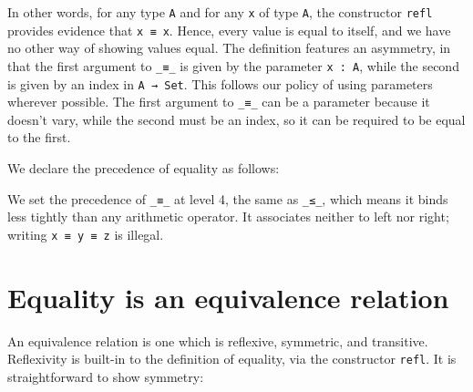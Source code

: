 In other words, for any type \texttt{A} and for any \texttt{x} of type
\texttt{A}, the constructor \texttt{refl} provides evidence that
\texttt{x\ ≡\ x}. Hence, every value is equal to itself, and we have no
other way of showing values equal. The definition features an asymmetry,
in that the first argument to \texttt{\_≡\_} is given by the parameter
\texttt{x\ :\ A}, while the second is given by an index in
\texttt{A\ →\ Set}. This follows our policy of using parameters wherever
possible. The first argument to \texttt{\_≡\_} can be a parameter
because it doesn't vary, while the second must be an index, so it can be
required to be equal to the first.

We declare the precedence of equality as follows:

\begin{fence}
\begin{code}%
\>[0]\AgdaSpace{}%
\AgdaSpace{}%
\<%
\end{code}
\end{fence}

We set the precedence of \texttt{\_≡\_} at level 4, the same as
\texttt{\_≤\_}, which means it binds less tightly than any arithmetic
operator. It associates neither to left nor right; writing
\texttt{x\ ≡\ y\ ≡\ z} is illegal.

\hypertarget{equality-is-an-equivalence-relation}{%
\section{Equality is an equivalence
relation}\label{equality-is-an-equivalence-relation}}

An equivalence relation is one which is reflexive, symmetric, and
transitive. Reflexivity is built-in to the definition of equality, via
the constructor \texttt{refl}. It is straightforward to show symmetry:

\begin{fence}
\begin{code}%
\>[0]\AgdaSpace{}%
\AgdaSymbol{:}\AgdaSpace{}%
\AgdaSpace{}%
\AgdaSymbol{\{}\AgdaSpace{}%
\AgdaSymbol{:}\AgdaSpace{}%
\AgdaSymbol{\}}\AgdaSpace{}%
\AgdaSymbol{\{}\AgdaSpace{}%
\AgdaSpace{}%
\AgdaSymbol{:}\AgdaSpace{}%
\AgdaSymbol{\}}\<%
\\
\>[0][@{}l@{\AgdaIndent{0}}]%
\>[2]%
\>[29I]\AgdaSpace{}%
\AgdaSpace{}%
\<%
\\
\>[.][@{}l@{}]\<[29I]%
\>[4]\AgdaComment{-----}\<%
\\
%
\>[2]\AgdaSpace{}%
\AgdaSpace{}%
\AgdaSpace{}%
\<%
\\
\>[0]\AgdaSpace{}%
\AgdaSpace{}%
\AgdaSymbol{=}\AgdaSpace{}%
\<%
\end{code}
\end{fence}

